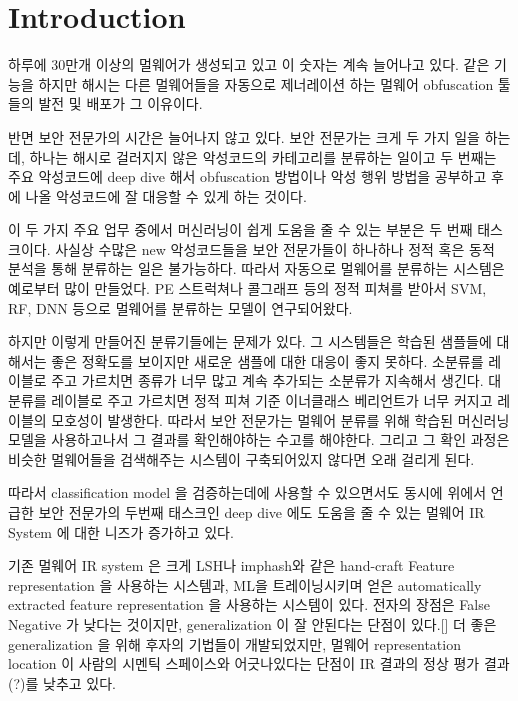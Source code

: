 \section{Introduction}

하루에 30만개 이상의 멀웨어가 생성되고 있고 이 숫자는 계속 늘어나고 있다. %
같은 기능을 하지만 해시는 다른 멀웨어들을 자동으로 제너레이션 하는 멀웨어 obfuscation 툴들의 발전 및 배포가 그 이유이다. 

반면 보안 전문가의 시간은 늘어나지 않고 있다. 보안 전문가는 크게 두 가지 일을 하는데, 하나는 해시로 걸러지지 않은 악성코드의 카테고리를 분류하는 일이고 두 번째는  주요 악성코드에 deep dive 해서 obfuscation 방법이나 악성 행위 방법을 공부하고 후에 나올 악성코드에 잘 대응할 수 있게 하는 것이다.   

이 두 가지 주요 업무 중에서 머신러닝이 쉽게 도움을 줄 수 있는 부분은 두 번째 태스크이다. 사실상 수많은 new 악성코드들을 보안 전문가들이 하나하나 정적 혹은 동적 분석을 통해 분류하는 일은 불가능하다. 따라서 자동으로 멀웨어를 분류하는 시스템은 예로부터 많이 만들었다. PE 스트럭쳐나 콜그래프 등의 정적 피쳐를 받아서 SVM, RF, DNN 등으로 멀웨어를 분류하는 모델이 연구되어왔다.   

하지만 이렇게 만들어진 분류기들에는 문제가 있다.%
 그 시스템들은 학습된 샘플들에 대해서는 좋은 정확도를 보이지만 새로운 샘플에 대한 대응이 좋지 못하다. 소분류를 레이블로 주고 가르치면 종류가 너무 많고 계속 추가되는 소분류가 지속해서 생긴다. 대분류를 레이블로 주고 가르치면 정적 피쳐 기준 이너클래스 베리언트가 너무 커지고 레이블의 모호성이 발생한다. 따라서 보안 전문가는 멀웨어 분류를 위해 학습된 머신러닝 모델을 사용하고나서 그 결과를 확인해야하는 수고를 해야한다. 그리고 그 확인 과정은 비슷한 멀웨어들을 검색해주는 시스템이 구축되어있지 않다면 오래 걸리게 된다.  

따라서 classification model 을 검증하는데에 사용할 수 있으면서도 동시에 위에서 언급한 보안 전문가의 두번째 태스크인 deep dive 에도 도움을 줄 수 있는 멀웨어 IR System 에 대한 니즈가 증가하고 있다.  
 
기존 멀웨어 IR system 은 크게 LSH나 imphash와 같은 hand-craft Feature representation 을 사용하는 시스템과, ML을 트레이닝시키며 얻은 automatically extracted feature representation 을 사용하는 시스템이 있다. 전자의 장점은 False Negative 가 낮다는 것이지만, generalization 이 잘 안된다는 단점이 있다.[] 더 좋은 generalization 을 위해 후자의 기법들이 개발되었지만, 멀웨어 representation location 이 사람의 시멘틱 스페이스와 어긋나있다는 단점이 IR 결과의 정상 평가 결과(?)를 낮추고 있다.   

